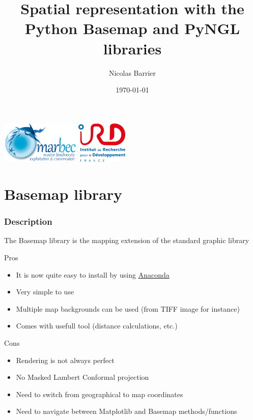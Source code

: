 \documentclass{beamer}
\title[Spatial representation with Python]{Spatial representation with the Python Basemap and PyNGL libraries} %
\author{Nicolas Barrier} %
\institute[UMR MARBEC] %
{
UMR MARBEC \\ %
\medskip
\textit{nicolas.barrier@ird.fr} %
}
\date{\today} %
\begin{document}
\begin{frame}
\titlepage %
    \vspace{-1em}
\begin{center}
\includegraphics[height=2cm]{logo-marbec.png}
\hspace{1em}
\includegraphics[height=2cm]{logo_ird.png}
\end{center}
\end{frame}

\section{Basemap library}
\begin{frame}[fragile]
\frametitle{Description}
    The Basemap library is the mapping extension of the standard graphic library
    \footnotesize{
\begin{block}{Pros}
    \begin{itemize}
        \item{It is now quite easy to install by using \href{https://www.anaconda.com/}{Anaconda}}
        \item{Very simple to use}
        \item{Multiple map backgrounds can be used (from TIFF image for instance)}
        \item{Comes with usefull tool (distance calculations, etc.)}
    \end{itemize}
\end{block}
\begin{alertblock}{Cons}
    \begin{itemize}
        \item{Rendering is not always perfect}
        \item{No Masked Lambert Conformal projection}
        \item{Need to switch from geographical to map coordinates}
        \item{Need to navigate between Matplotlib and Basemap methods/functions}
    \end{itemize}
\end{alertblock}
}
\end{frame}
\end{document}
